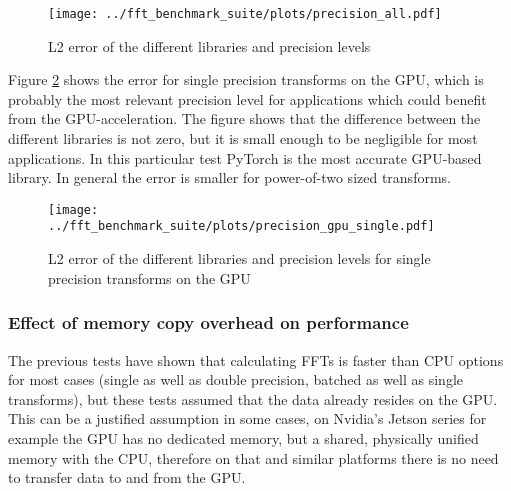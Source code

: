 \documentclass[english,11pt,a4paper,table]{article} %
\begin{document}
\begin{figure}[H]
	\centering
	\texttt{[image: ../fft\_benchmark\_suite/plots/precision\_all.pdf]}
	\caption{L2 error of the different libraries and precision levels}
	\label{error-all}
\end{figure}

Figure \ref{error-single-gpu} shows the error for single precision transforms on the GPU, which is probably the most relevant precision level for applications which could benefit from the GPU-acceleration.
The figure shows that the difference between the different libraries is not zero, but it is small enough to be negligible for most applications.
In this particular test PyTorch is the most accurate GPU-based library.
In general the error is smaller for power-of-two sized transforms.

\begin{figure}[H]
	\centering
	\texttt{[image: ../fft\_benchmark\_suite/plots/precision\_gpu\_single.pdf]}
	\caption{L2 error of the different libraries and precision levels for single precision transforms on the GPU}
	\label{error-single-gpu}
\end{figure}

\subsubsection{Effect of memory copy overhead on performance}

The previous tests have shown that calculating FFTs is faster than CPU options for most cases (single as well as double precision, batched as well as single transforms), but these tests assumed that the data already resides on the GPU.
This can be a justified assumption in some cases, on Nvidia's Jetson series for example the GPU has no dedicated memory, but a shared, physically unified memory with the CPU, therefore on that and similar platforms there is no need to transfer data to and from the GPU. \cite{Jetson-um}
\end{document}
